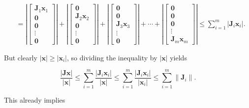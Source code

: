 \begin{align}
	&= \left\lvert \left[\begin{array}{c} \mathbf{J}_1\mathbf{x}_1 \\[3mm] \mathbf{0} \\[3mm] \mathbf{0} \\[3mm] \vdots \\[3mm] \mathbf{0} \end{array}\right] \right\rvert + \left\lvert \left[\begin{array}{c} \mathbf{0} \\[3mm] \mathbf{J}_2\mathbf{x}_2 \\[3mm] \mathbf{0} \\[3mm] \vdots \\[3mm] \mathbf{0} \end{array}\right] \right\rvert + \left\lvert \left[\begin{array}{c} \mathbf{0} \\[3mm] \mathbf{0} \\[3mm] \mathbf{J}_3\mathbf{x}_3 \\[3mm] \vdots \\[3mm] \mathbf{0} \end{array}\right] \right\rvert + \cdots + \left\lvert \left[\begin{array}{c} \mathbf{0} \\[3mm] \mathbf{0} \\[3mm] \mathbf{0} \\[3mm] \vdots \\[3mm] \mathbf{J}_m\mathbf{x}_m \end{array}\right] \right\rvert \leq \sum_{i=1}^m \left\lvert \mathbf{J}_i\mathbf{x}_i\right\rvert.
\end{align}

	But clearly $\left\lvert \mathbf{x} \right\rvert \geq \left\lvert \mathbf{x}_i \right\rvert$, so dividing the inequality by $\left\lvert\mathbf{x}\right\rvert$ yields

\begin{equation}
	\dfrac{\left\lvert \mathbf{Jx}\right\rvert}{\left\lvert \mathbf{x}\right\rvert} \leq \sum_{i=1}^m \dfrac{\left\lvert \mathbf{J}_i\mathbf{x}_i\right\rvert}{\left\lvert \mathbf{x}\right\rvert} \leq \sum_{i=1}^m  \dfrac{\left\lvert\mathbf{J}_i\mathbf{x}_i\right\rvert}{\left\lvert \mathbf{x}_i\right\rvert} \leq  \sum_{i=1}^m \left\lVert\mathbf{J}_i\right\rVert . \label{eq:jordan_ineq}
\end{equation}

	This already implies

